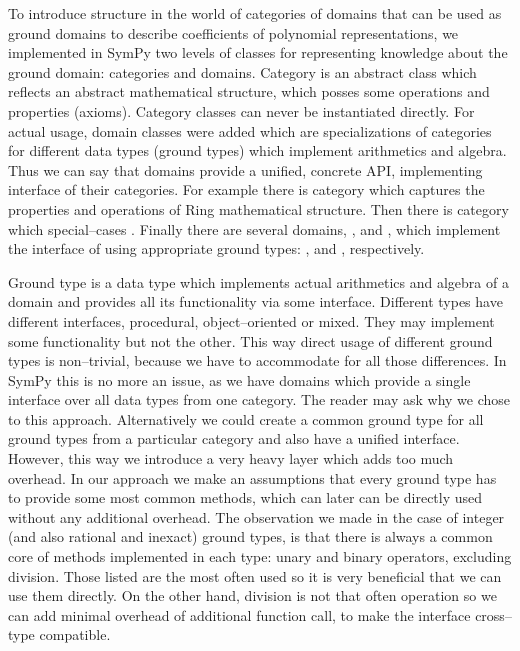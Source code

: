 To introduce structure in the world of categories of domains that can be used as ground domains to describe
coefficients of polynomial representations, we implemented in SymPy two levels of classes for representing
knowledge about the ground domain: categories and domains. Category is an abstract class which reflects an
abstract mathematical structure, which posses some operations and properties (axioms). Category classes can
never be instantiated directly. For actual usage, domain classes were added which are specializations of
categories for different data types (ground types) which implement arithmetics and algebra. Thus we can say
that domains provide a unified, concrete API, implementing interface of their categories. For example there
is  category which captures the properties and operations of Ring mathematical structure. Then
there is  category which special--cases . Finally there are several domains,
,  and , which implement the interface of 
using appropriate ground types: ,  and , respectively.

Ground type is a data type which implements actual arithmetics and algebra of a domain and provides all its
functionality via some interface. Different types have different interfaces, procedural, object--oriented or
mixed. They may implement some functionality but not the other. This way direct usage of different ground
types is non--trivial, because we have to accommodate for all those differences. In SymPy this is no more
an issue, as we have domains which provide a single interface over all data types from one category. The
reader may ask why we chose to this approach. Alternatively we could create a common ground type for all
ground types from a particular category and also have a unified interface. However, this way we introduce
a very heavy layer which adds too much overhead. In our approach we make an assumptions that every ground
type has to provide some most common methods, which can later can be directly used without any additional
overhead. The observation we made in the case of integer (and also rational and inexact) ground types, is
that there is always a common core of methods implemented in each type: unary and binary operators, excluding
division. Those listed are the most often used so it is very beneficial that we can use them directly. On
the other hand, division is not that often operation so we can add minimal overhead of additional function
call, to make the interface cross--type compatible.

